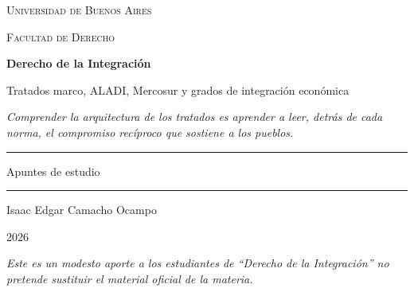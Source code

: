 \documentclass[12pt,oneside]{book}
\newcommand{\universidad}{Universidad de Buenos Aires}
\newcommand{\facultad}{Facultad de Derecho}
\newcommand{\materia}{Derecho de la Integración}
\newcommand{\titulo}{Tratados marco, ALADI, Mercosur y grados de integración económica}
\newcommand{\autor}{Isaac Edgar Camacho Ocampo}
\newcommand{\anio}{2026}
\begin{document}
\begin{titlepage}

\thispagestyle{empty}

\begin{center}

\vspace*{1cm}

{\large \textsc{\universidad}}

\vspace{0.2cm}

{\large \textsc{\facultad}}

\vspace{3cm}

{\Huge \textbf{\materia}}

\vspace{1cm}

{\LARGE \titulo}

\vspace{0.8cm}

\textit{Comprender la arquitectura de los tratados es aprender a leer, detrás de cada norma, el compromiso recíproco que sostiene a los pueblos.}

\vspace{1.2cm}

\rule{0.70\textwidth}{0.5pt}

\vspace{0.5cm}

{\large Apuntes de estudio}

\vspace{0.5cm}

\rule{0.70\textwidth}{0.5pt}

\vfill

{\large \autor}

\vspace{0.3cm}

{\large \anio}

\end{center}

\vfill

\begin{flushleft}
\textit{Este es un modesto aporte a los estudiantes de ``Derecho de la Integración'' no pretende sustituir el material oficial de la materia.}
\end{flushleft}

\end{titlepage}
\end{document}
